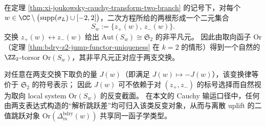 \begin{remark}\label{rem:xi-joukowsky-two-branch-orientation-torsor-jump}
在定理 \ref{thm:xi-joukowsky-cauchy-transform-two-branch} 的记号下，对每个 \(w\in\CC\setminus\bigl(\mathrm{supp}(\sigma_L)\cup[-2,2]\bigr)\)，二次方程所给的两根形成一个二元集合
\[
S_w:=\{z_+(w),\,z_-(w)\}.
\]
交换 \(z_+(w)\leftrightarrow z_-(w)\) 给出 \(\mathrm{Aut}(S_w)\cong \mathfrak{S}_2\) 的非平凡元。
因此由取向函子 \(\mathrm{Or}\)（定理 \ref{thm:bdry-z2-jump-functor-uniqueness} 在 \(k=2\) 的情形）得到一个自然的 \(\ZZ_2\)-torsor \(\mathrm{Or}(S_w)\)，其非平凡元正对应于两支交换。
\par
对任意在两支交换下取负的量 \(J(w)\)（即满足 \(J(w)\mapsto -J(w)\)），该变换律等价于 \(\mathfrak{S}_2\) 的符号表示；
因此 \(J(w)\) 可不依赖于对 \((z_+,z_-)\) 的标号选择而自然视为取向 local system \(\mathrm{Or}(S_w)\) 的反变截面。
在本文的 Cauchy 输运口径中，任何由两支表达式构造的“解析跳跃差”均可归入该类反变对象，从而与离散 uplift 的二值跳跃对象 \(\mathrm{Or}(\Delta_m^{\mathrm{bdry}}(w))\) 共享同一函子学类型。
\end{remark}

